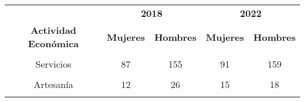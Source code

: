 \begin{tabular}[t]{ccccc}
\toprule
\multicolumn{1}{c}{\textbf{ }} & \multicolumn{2}{c}{\textbf{2018}} & \multicolumn{2}{c}{\textbf{2022}} \\
\cmidrule(l{3pt}r{3pt}){2-3} \cmidrule(l{3pt}r{3pt}){4-5}
\textbf{Actividad Económica} & \textbf{Mujeres} & \textbf{Hombres} & \textbf{Mujeres} & \textbf{Hombres}\\
\midrule
\cellcolor[HTML]{B6B3FF}{Comercio} & \cellcolor[HTML]{B6B3FF}{865} & \cellcolor[HTML]{B6B3FF}{1050} & \cellcolor[HTML]{B6B3FF}{640} & \cellcolor[HTML]{B6B3FF}{836}\\
Servicios & 87 & 155 & 91 & 159\\
\cellcolor[HTML]{B6B3FF}{Industria} & \cellcolor[HTML]{B6B3FF}{31} & \cellcolor[HTML]{B6B3FF}{52} & \cellcolor[HTML]{B6B3FF}{9} & \cellcolor[HTML]{B6B3FF}{30}\\
Artesanía & 12 & 26 & 15 & 18\\
\cellcolor[HTML]{B6B3FF}{Agroindustria} & \cellcolor[HTML]{B6B3FF}{5} & \cellcolor[HTML]{B6B3FF}{5} & \cellcolor[HTML]{B6B3FF}{11} & \cellcolor[HTML]{B6B3FF}{14}\\
\bottomrule
\end{tabular}

